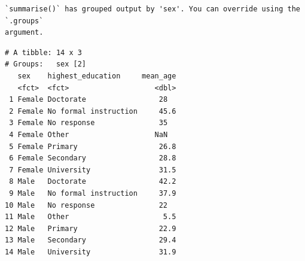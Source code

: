 \documentclass[
  letterpaper,
  DIV=11,
  numbers=noendperiod]{scrreprt}
\begin{document}
\begin{verbatim}
`summarise()` has grouped output by 'sex'. You can override using the `.groups`
argument.
\end{verbatim}

\begin{verbatim}
# A tibble: 14 x 3
# Groups:   sex [2]
   sex    highest_education     mean_age
   <fct>  <fct>                    <dbl>
 1 Female Doctorate                 28  
 2 Female No formal instruction     45.6
 3 Female No response               35  
 4 Female Other                    NaN  
 5 Female Primary                   26.8
 6 Female Secondary                 28.8
 7 Female University                31.5
 8 Male   Doctorate                 42.2
 9 Male   No formal instruction     37.9
10 Male   No response               22  
11 Male   Other                      5.5
12 Male   Primary                   22.9
13 Male   Secondary                 29.4
14 Male   University                31.9
\end{verbatim}
\end{document}
